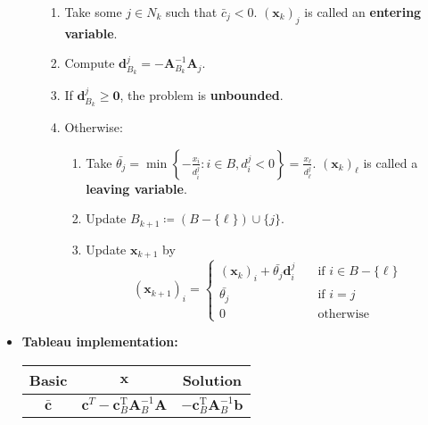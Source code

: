 \documentclass[10pt]{article}
\begin{document}
\begin{multicols*}{3}
\begin{itemize}
\begin{enumerate}
                \begin{enumerate}
                    \item Take some $j \in N_k$ such that $\bar{c}_j < 0$. $\left(\bm{x}_{k}\right)_j$ is called an \textbf{entering variable}.
                    \item Compute $\bm{d}^j_{B_k} = -\bm{A}_{B_k}^{-1}\bm{A}_j$.
                    \item If $\bm{d}^j_{B_k} \geq \mathbf{0}$, the problem is \textbf{unbounded}.
                    \item Otherwise:
                    \begin{enumerate}
                        \item Take $\bar{\theta_j} = \min\left\{-\frac{x_i}{d^j_i} \colon i \in B, d^j_i < 0\right\} = \frac{x_{\ell}}{d^j_{\ell}}$. $\left(\bm{x}_{k}\right)_{\ell}$ is called a \textbf{leaving variable}.
                        \item Update $B_{k + 1} \coloneqq (B - \{\ell\}) \cup \{j\}$.
                        \item Update $\bm{x}_{k + 1}$ by 
                        \begin{equation*}
                            \left(\bm{x}_{k + 1}\right)_i = \begin{cases}
                                \left(\bm{x}_{k}\right)_i + \bar{\theta_j}\bm{d}^j_i & \quad\textrm{if } i \in B - \{\ell\} \\
                                \bar{\theta_j} & \quad\textrm{if } i = j \\
                                0 & \quad\textrm{otherwise}
                            \end{cases}
                        \end{equation*} 
                    \end{enumerate}
                \end{enumerate}
            \end{enumerate}
            \item \textbf{Tableau implementation:} 
            \begin{center}
                \begin{tabular}{|c|c|c|}
                    \hline
                    Basic & $\bm{x}$ & Solution \\
                    \hline
                    $\bm{\bar{c}}$ & $\bm{c}^{T} - \bm{c}_B^{\mathrm{T}}\bm{A}_B^{-1}\bm{A}$ & $-\bm{c}_B^{\mathrm{T}}\bm{A}_B^{-1}\bm{b}$ \\

\end{tabular}
\end{center}
\end{itemize}
\end{multicols*}
\end{document}
